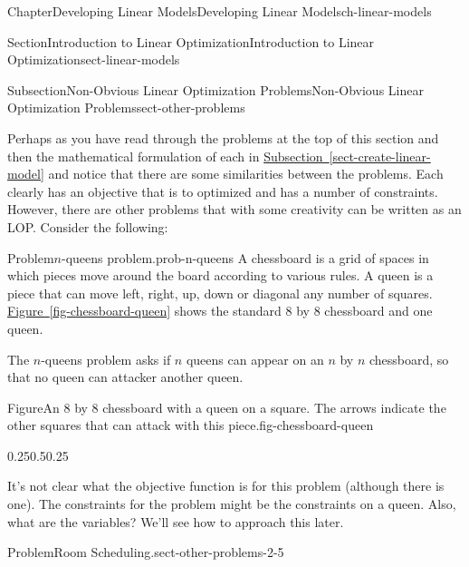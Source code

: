 \documentclass[oneside,10pt,]{book}
\newcommand{\xreffont}{\relax}
\numberwithin{equation}{section}
\begin{document}
\begin{chapterptx}{Chapter}{Developing Linear Models}{}{Developing Linear Models}{}{}{ch-linear-models}
\begin{sectionptx}{Section}{Introduction to Linear Optimization}{}{Introduction to Linear Optimization}{}{}{sect-linear-models}
\begin{subsectionptx}{Subsection}{Non-Obvious Linear Optimization Problems}{}{Non-Obvious Linear Optimization Problems}{}{}{sect-other-problems}
\begin{introduction}{}%
Perhaps as you have read through the problems at the top of this section and then the mathematical formulation of each in \hyperref[sect-create-linear-model]{Subsection~{\xreffont\ref{sect-create-linear-model}}} and notice that there are some similarities between the problems. Each clearly has an objective that is to optimized and has a number of constraints. However, there are other problems that with some creativity can be written as an LOP. Consider the following:%
\begin{problem}{Problem}{\(n\)-queens problem.}{prob-n-queens}%
A chessboard is a grid of spaces in which pieces move around the board according to various rules. A queen is a piece that can move left, right, up, down or diagonal any number of squares. \hyperref[fig-chessboard-queen]{Figure~{\xreffont\ref{fig-chessboard-queen}}} shows the standard 8 by 8 chessboard and one queen.%
\par
The \(n\)-queens problem asks if \(n\) queens can appear on an \(n\) by \(n\) chessboard, so that no queen can attacker another queen.%
\end{problem}
\begin{figureptx}{Figure}{An 8 by 8 chessboard with a queen on a square.  The arrows indicate the other squares that can attack with this piece.}{fig-chessboard-queen}{}%
\begin{image}{0.25}{0.5}{0.25}{}%
%
\end{image}%
\tcblower
\end{figureptx}%
It's not clear what the objective function is for this problem (although there is one). The constraints for the problem might be the constraints on a queen. Also, what are the variables?  We'll see how to approach this later.%
\begin{problem}{Problem}{Room Scheduling.}{sect-other-problems-2-5}%

\end{problem}
\end{introduction}
\end{subsectionptx}
\end{sectionptx}
\end{chapterptx}
\end{document}

